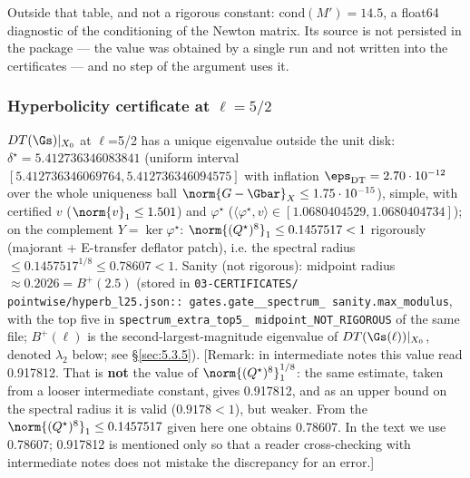 \FloatBarrier

Outside that table, and not a rigorous constant: $\mathrm{cond}(M') = 14.5$, a
float64 diagnostic of the conditioning of the Newton matrix. Its source is not
persisted in the package --- the value was obtained by a single run and not
written into the certificates --- and no step of the argument uses it.

\subsubsection{Hyperbolicity certificate at $\ell = 5/2$}
\label{sec:5.3.4}

\begin{theorem}[Hyp-5-W9-L25]
$DT(\Gs)|_{X_{0}}$ at $\ell$=5/2 has a unique eigenvalue outside the unit disk:
$\delta^{\star} = 5.412736346083841$ (uniform interval
$[5.412736346069764, 5.412736346094575]$ with inflation
$\eps_{\mathrm{DT}} = 2.70\cdot 10^{-12}$ over the whole uniqueness ball
$\norm{G-\Gbar}_X \le 1.75\cdot 10^{-15}$), simple, with certified $v$ ($\norm{v}_1 \le
1.501$) and $\varphi^{\star}$ ($\langle \varphi^{\star},v\rangle \in
[1.0680404529, 1.0680404734]$); on the complement $Y=\ker \varphi^{\star}$:
$\norm{(Q^{\star})^{8}}_1 \le 0.1457517 < 1$ rigorously (majorant +
E-transfer deflator patch), i.e. the spectral radius $\le
0.1457517^{1/8} \le 0.78607 < 1$. Sanity (not rigorous): midpoint radius $\approx 0.2026 =
B^{+}(2.5)$ (stored in \texttt{03-\allowbreak CERTIFICATES/\allowbreak
pointwise/\allowbreak hyperb\_\allowbreak l25.json\allowbreak ::\allowbreak
gates.\allowbreak gate\_\_\allowbreak spectrum\_\allowbreak
sanity.\allowbreak max\_\allowbreak modulus}, with the top five in
\texttt{spectrum\_\allowbreak extra\_\allowbreak top5\_\allowbreak
midpoint\_\allowbreak NOT\_\allowbreak RIGOROUS} of the same file;
$B^{+}(\ell)$ is the second-largest-magnitude eigenvalue of
$DT(\Gs(\ell))|_{X_{0}}$, denoted $\lambda_2$ below; see \S\ref{sec:5.3.5}).
[Remark: in intermediate notes this value read 0.917812. That is \textbf{not}
the value of $\norm{(Q^{\star})^{8}}_1^{1/8}$: the same estimate, taken from a
looser intermediate constant, gives 0.917812, and as an upper bound on the
spectral radius it is valid ($0.9178 < 1$), but weaker. From the
$\norm{(Q^{\star})^{8}}_1 \le 0.1457517$ given here one obtains 0.78607. In the
text we use 0.78607; 0.917812 is mentioned only so that a reader
cross-checking with intermediate notes does not mistake the discrepancy for an
error.]
\end{theorem}

